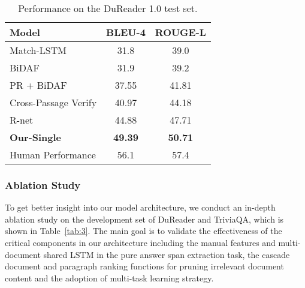 \documentclass[letterpaper]{article} \usepackage{aaai19}  \usepackage{graphicx}
\begin{document}
\begin{table}[t]
\scriptsize
\centering
\caption{\label{tab:2} Performance on the DuReader 1.0 test set.}
\begin{tabular}{lcc}
\hline
   \textbf{Model} & \textbf{BLEU-4}  & \textbf{ROUGE-L} \\
\hline
    Match-LSTM \cite{wang2016machine} & 31.8 &  39.0 \\
    BiDAF \cite{seo2016bidirectional} & 31.9 & 39.2 \\
    PR + BiDAF \cite{wang2018multi} &  37.55 &  41.81 \\
    Cross-Passage Verify \cite{wang2018multi} &  40.97 &  44.18 \\
    R-net \cite{wang2017gated} & 44.88 & 47.71 \\
    \textbf{Our-Single} &  \textbf{49.39} &  \textbf{50.71} \\
\hline
    Human Performance & 56.1  & 57.4 \\
\hline
\end{tabular} \vspace{-3mm}
\end{table} 























\subsubsection{Ablation Study}
To get better insight into our model architecture, we conduct an in-depth ablation study on the development set of DuReader and TriviaQA, which is shown in Table~\ref{tab:3}. The main goal is to validate the effectiveness of the critical components in our architecture including the manual features and multi-document shared LSTM in the pure answer span extraction task, the cascade document and paragraph ranking functions for pruning irrelevant document content and the adoption of multi-task learning strategy.
\end{document}
